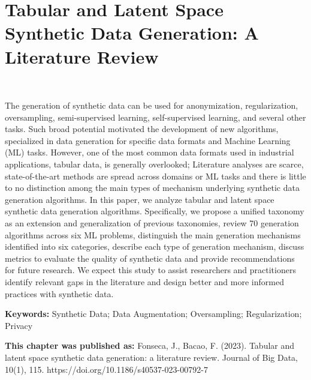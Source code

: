 \chapter{%
    Tabular and Latent Space Synthetic Data Generation: A Literature Review
}~\label{chp:synthetic-data-review}
\graphicspath{{figures/synthetic-data-review/}}

\begin{adjustwidth}{30pt}{30pt}

    The generation of synthetic data can be used for anonymization,
    regularization, oversampling, semi-supervised learning, self-supervised
    learning, and several other tasks. Such broad potential motivated the
    development of new algorithms, specialized in data generation for specific
    data formats and Machine Learning (ML) tasks. However, one of the most
    common data formats used in industrial applications, tabular data, is
    generally overlooked; Literature analyses are scarce, state-of-the-art
    methods are spread across domains or ML tasks and there is little to no
    distinction among the main types of mechanism underlying synthetic data
    generation algorithms. In this paper, we analyze tabular and latent space
    synthetic data generation algorithms. Specifically, we propose a unified
    taxonomy as an extension and generalization of previous taxonomies, review
    70 generation algorithms across six ML problems, distinguish the main
    generation mechanisms identified into six categories, describe each type
    of generation mechanism, discuss metrics to evaluate the quality of
    synthetic data and provide recommendations for future research. We expect
    this study to assist researchers and practitioners identify relevant gaps
    in the literature and design better and more informed practices with
    synthetic data.

\end{adjustwidth}

\vspace{.5cm}
\textbf{Keywords:} Synthetic Data; Data Augmentation; Oversampling;
Regularization; Privacy











\textbf{This chapter was published as:} Fonseca, J., Bacao, F. (2023). Tabular
and latent space synthetic data generation: a literature review. Journal of
Big Data, 10(1), 115.  https://doi.org/10.1186/s40537-023-00792-7
